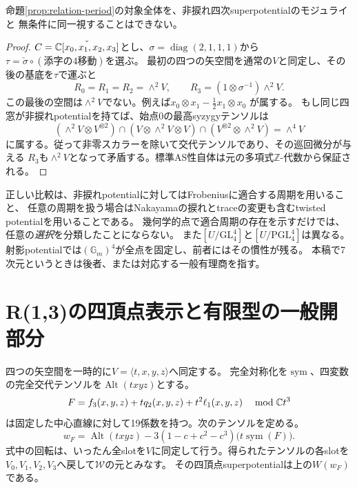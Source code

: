 \begin{proposition}\label{prop:period-counterexample}
命題\ref{prop:relation-period}の対象全体を、非捩れ四次superpotentialのモジュライと
無条件に同一視することはできない。
\end{proposition}
\begin{proof}
$C=\check{\mathbb C[x_0,x_1,x_2,x_3]}$とし、$\sigma=\operatorname{diag}(2,1,1,1)$から
$\tau=\check\sigma\circ(\text{添字の4移動})$を選ぶ。
最初の四つの矢空間を通常の$V$と同定し、その後の基底を$\tau$で運ぶと
\[
 R_0=R_1=R_2=\wedge^2V,\qquad R_3=(1\otimes\sigma^{-1})\wedge^2V.
\]
この最後の空間は$\wedge^2V$でない。例えば$x_0\otimes x_1-\frac12x_1\otimes x_0$
が属する。
もし同じ四窓が非捩れpotentialを持てば、始点0の最高syzygyテンソルは
\[
 (\wedge^2V\otimes V^{\otimes2})\cap
 (V\otimes\wedge^2V\otimes V)\cap
 (V^{\otimes2}\otimes\wedge^2V)=\wedge^4V
\]
に属する。従って非零スカラーを除いて交代テンソルであり、その巡回微分が与える
$R_3$も$\wedge^2V$となって矛盾する。標準AS性自体は元の多項式$\mathbb Z$-代数から保証される。
\end{proof}

正しい比較は、非捩れpotentialに対してはFrobeniusに適合する周期を用いること、
任意の周期を扱う場合はNakayamaの捩れとtraceの変更も含むtwisted potentialを用いることである。
幾何学的点で適合周期の存在を示すだけでは、任意の\emph{選択}を分類したことにならない。
また$[U/\mathrm{GL}_4^4]$と$[U/\mathrm{PGL}_4^4]$は異なる。
射影potentialでは$(\mathbb G_m)^4$が全点を固定し、前者にはその慣性が残る。
本稿で7次元というときは後者、または対応する一般有理商を指す。

\section{R(1,3)の四頂点表示と有限型の一般開部分}\label{sec:r13-explicit}
四つの矢空間を一時的に$V=\langle t,x,y,z\rangle$へ同定する。
完全対称化を$\operatorname{sym}$、四変数の完全交代テンソルを$\operatorname{Alt}(txyz)$とする。
\[
 F=f_3(x,y,z)+tq_2(x,y,z)+t^2\ell_1(x,y,z)
 \quad\bmod\mathbb C t^3
\]
は固定した中心直線に対して19係数を持つ。次のテンソルを定める。
\begin{equation}\label{eq:r13-potential}
 w_F=\operatorname{Alt}(txyz)
       -3(1-c+c^2-c^3)\bigl(t\operatorname{sym}(F)\bigr).
\end{equation}
式中の回転は、いったん全slotを$V$に同定して行う。得られたテンソルの各slotを
$V_0,V_1,V_2,V_3$へ戻して$\mathcal W$の元とみなす。
その四頂点superpotentialは上の$W(w_F)$である。

